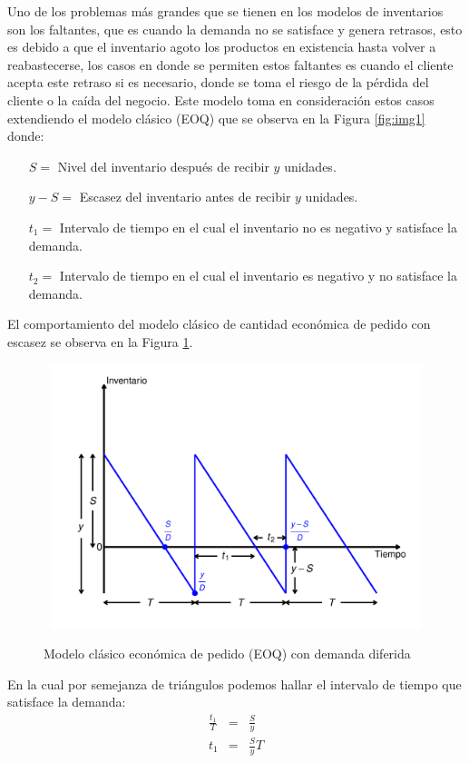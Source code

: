 \label{EOQ_escasez}
Uno de los problemas más grandes que se tienen en los modelos de inventarios son los faltantes, que es cuando la demanda no se satisface y genera retrasos, esto es debido a que el inventario agoto los productos en existencia hasta volver a reabastecerse, los casos en donde se permiten estos faltantes es cuando el cliente acepta este retraso si es necesario, donde se toma el riesgo de la pérdida del cliente o la caída del negocio. Este modelo toma en consideración estos casos extendiendo el modelo clásico (EOQ) que se observa en la Figura \ref{fig:img1} donde:
\begin{itemize}
	\item[$S=$] Nivel del inventario después de recibir $y$ unidades.
	\item[$y-S=$] Escasez del inventario antes de recibir $y$ unidades.
	\item[$t_1=$] Intervalo de tiempo en el cual el inventario no es negativo y satisface la demanda.
	\item[$t_2=$] Intervalo de tiempo en el cual el inventario es negativo y no satisface la demanda.
\end{itemize}
El comportamiento del modelo clásico de cantidad económica de pedido con escasez se observa en la Figura \ref{fig:imga}.
\newpage
\begin{figure}[H]
  \caption{Modelo clásico económica de pedido (EOQ) con demanda diferida}
  {\includegraphics[width=15cm, height=7.7cm]{images/imga.pdf}}
  \label{fig:imga}
\end{figure}
En la cual por semejanza de triángulos podemos hallar el intervalo de tiempo que satisface la demanda:
\begin{eqnarray}
	\frac{t_1}{T} &=& \frac{S}{y} \nonumber \\
	t_1 &=& \frac{S}{y}T \nonumber
\end{eqnarray}
